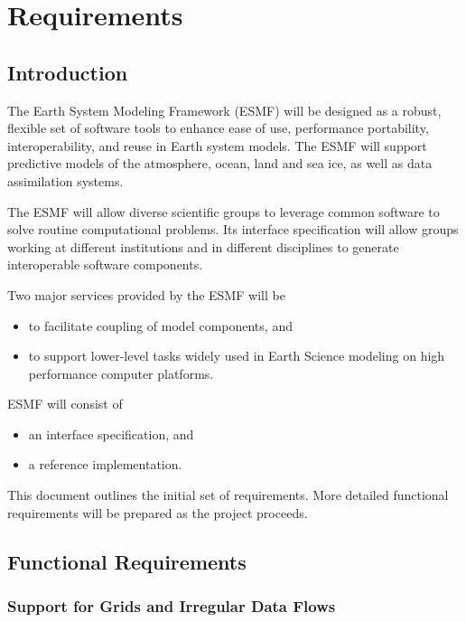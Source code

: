 \section{Requirements}

\subsection{Introduction}
           
The Earth System Modeling Framework (ESMF) will be designed as a robust, 
flexible set of software tools to enhance ease of use, performance 
portability, interoperability, and reuse in Earth system models. The ESMF 
will support predictive models of the atmosphere, ocean, land and sea ice, as 
well as data assimilation systems.

The ESMF will allow diverse scientific groups to leverage common software to 
solve routine computational problems. Its interface specification will allow 
groups working at different institutions and in different disciplines to
generate interoperable software components.  

Two major services provided by the ESMF will be
\begin{itemize}
\item to facilitate coupling of model components, and 
\item to support lower-level tasks widely used in Earth Science modeling on 
high performance computer platforms. 
\end{itemize}
ESMF will consist of 
\begin{itemize}
\item an interface specification, and 
\item a reference implementation.
\end{itemize}
This document outlines the initial set of requirements. More detailed functional 
requirements will be prepared as the project proceeds.

\subsection{Functional Requirements}



\subsubsection{Support for Grids and Irregular Data Flows}




